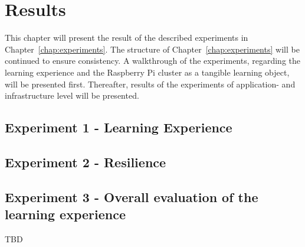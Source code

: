 \chapter{Results}

This chapter will present the result of the described experiments in Chapter~\ref{chap:experiments}. The structure of Chapter~\ref{chap:experiments} will be continued to ensure consistency. A walkthrough of the experiments, regarding the learning experience and the Raspberry Pi cluster as a tangible learning object, will be presented first. Thereafter, results of the experiments of application- and infrastructure level will be presented.

\section{Experiment 1 - Learning Experience}



\section{Experiment 2 - Resilience}



\section{Experiment 3 - Overall evaluation of the learning experience}

TBD
	






